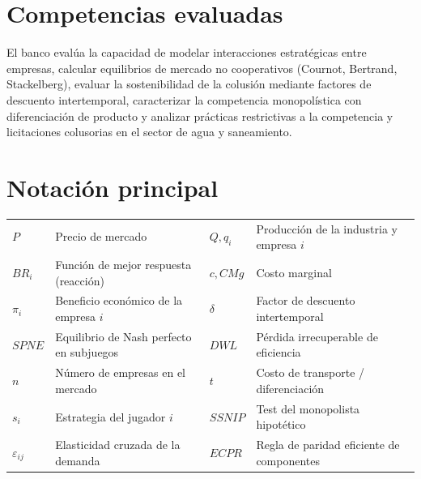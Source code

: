 \documentclass[11pt,a4paper]{article}
\newcounter{qnum}
\begin{document}
\section*{Competencias evaluadas}

\noindent El banco evalúa la capacidad de modelar interacciones estratégicas entre empresas, calcular equilibrios de mercado no cooperativos (Cournot, Bertrand, Stackelberg), evaluar la sostenibilidad de la colusión mediante factores de descuento intertemporal, caracterizar la competencia monopolística con diferenciación de producto y analizar prácticas restrictivas a la competencia y licitaciones colusorias en el sector de agua y saneamiento.

\section*{Notación principal}

{\small
\renewcommand{\arraystretch}{1.0}
\begin{center}
\begin{tabular}{@{}ll@{\hspace{1.0cm}}ll@{}}
\toprule
$P$ & Precio de mercado & $Q, q_i$ & Producción de la industria y empresa $i$ \\
$BR_i$ & Función de mejor respuesta (reacción) & $c, CMg$ & Costo marginal \\
$\pi_i$ & Beneficio económico de la empresa $i$ & $\delta$ & Factor de descuento intertemporal \\
$SPNE$ & Equilibrio de Nash perfecto en subjuegos & $DWL$ & Pérdida irrecuperable de eficiencia \\
$n$ & Número de empresas en el mercado & $t$ & Costo de transporte / diferenciación \\
$s_i$ & Estrategia del jugador $i$ & $SSNIP$ & Test del monopolista hipotético \\
$\varepsilon_{ij}$ & Elasticidad cruzada de la demanda & $ECPR$ & Regla de paridad eficiente de componentes \\
\bottomrule
\end{tabular}
\end{center}
}

\newpage
\setcounter{qnum}{0}







\end{document}
